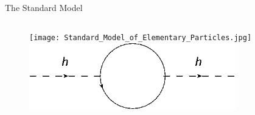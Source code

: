\begin{frame}{The Standard Model}
\begin{columns}
\begin{column}{.50\textwidth}
\begin{figure}[!Hhtbp]
  \begin{center}
    \texttt{[image: Standard\_Model\_of\_Elementary\_Particles.jpg]}\\
    \vspace{.6cm}
    \includegraphics[width=0.8\textwidth]{../figs/HierarchyLoop.png}
  \end{center}
\end{figure}
\end{column}
\end{columns}
\end{frame}


